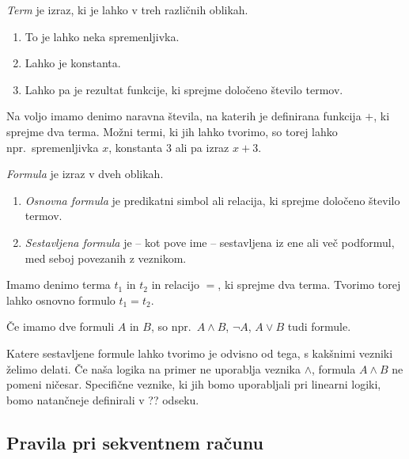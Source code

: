 \begin{definicija}
    \emph{Term} je izraz, ki je lahko v treh različnih oblikah.
    \begin{enumerate}
        \item To je lahko neka spremenljivka.
        \item Lahko je konstanta.
        \item Lahko pa je rezultat funkcije, ki sprejme določeno število termov.
    \end{enumerate}
\end{definicija}
\begin{primer*}
    Na voljo imamo denimo naravna števila, na katerih je definirana funkcija $+$, ki sprejme dva terma. Možni termi, ki jih lahko tvorimo, so torej lahko npr.\ spremenljivka $x$, konstanta $3$ ali pa izraz $x+3$.
\end{primer*}

\begin{definicija} \label{formula}
	\emph{Formula} je izraz v dveh oblikah.
	\begin{enumerate}
        \item \emph{Osnovna formula} je predikatni simbol ali relacija, ki sprejme določeno število termov.
        \item \emph{Sestavljena formula} je -- kot pove ime -- sestavljena iz ene ali več podformul, med seboj povezanih z veznikom.
	\end{enumerate}
\end{definicija}
\begin{primer*}
    Imamo denimo terma $t_1$ in $t_2$ in relacijo $=$, ki sprejme dva terma. Tvorimo torej lahko osnovno formulo $t_1=t_2$.
\end{primer*}
\begin{primer*}
    Če imamo dve formuli $A$ in $B$, so npr.\ $A \land B$, $\neg A$, $A \lor B$ tudi formule.
\end{primer*}
Katere sestavljene formule lahko tvorimo je odvisno od tega, s kakšnimi vezniki želimo delati. Če naša logika na primer ne uporablja veznika $\land$, formula $A \land B$ ne pomeni ničesar. Specifične veznike, ki jih bomo uporabljali pri linearni logiki, bomo natančneje definirali v ?? odseku.

\subsection{Pravila pri sekventnem računu}

